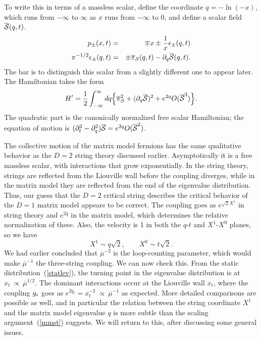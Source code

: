 To write this in terms of a massless scalar, define the coordinate
$q = - \ln(-x)$, which runs from $-\infty$ to $\infty$ as
$x$ runs from $-\infty$ to 0, and define a scalar field
$\overline{\cal S}(q,t)$.
\begin{eqnarray}
p_{\pm}(x,t) &=& \mp x \pm \frac{1}{x} \epsilon_\pm(q,t)  \label{ppm}
\nonumber\\
\pi^{-1/2} \epsilon_\pm(q,t) &=& \pm \overline\pi_{\cal S}(q,t) -
\partial_q \overline {\cal S}(q,t).
\end{eqnarray}
The bar is to distinguish
this scalar from a slightly different one to appear later.  The
Hamiltonian takes the form
\begin{equation}
H' = \frac{1}{2} \int_{-\infty}^\infty
 dq \Bigl\{ \overline\pi_{\cal S}^2 + (\partial_q \overline {\cal
S})^2 + e^{2q} O(\overline {\cal S}^3) \Bigr\}.
\end{equation}
The quadratic part is the canonically normalized free scalar
Hamiltonian; the equation of motion is $(\partial_t^2 -
\partial_q^2) \overline {\cal S} = e^{2q} O(\overline {\cal
S}^2)$.

The collective motion of the matrix model fermions has the same
qualitative behavior as the $D=2$ string theory discussed earlier.
Asymptotically it is a free massless scalar, with interactions
that grow exponentially.  In the string theory, strings are
reflected from the Liouville wall before the coupling diverges,
while in the matrix model they are reflected from the end of the
eigenvalue distribution.  Thus, our guess that the $D=2$
critical string describes the critical behavior of the $D=1$ matrix
model appears to be correct.  The coupling goes as $e^{\sqrt{2}
X^1}$ in string theory and $e^{2q}$ in the matrix model, which
determines the relative normalization of these.  Also, the velocity
is 1 in both the $q$-$t$ and $X^1$-$X^0$ planes, so we have
\begin{equation}
X^1 \sim q \sqrt{2},\qquad X^0 \sim t \sqrt{2}. \label{mmst}
\end{equation}
We had earlier concluded that $\overline \mu^{-2}$ is the
loop-counting parameter, which would make $\overline \mu^{-1}$
the three-string coupling.  We can now check this.  From the
static distribution~(\ref{statlev}), the turning point in the
eigenvalue distribution is at $x_t \ \propto\ \overline\mu^{1/2}$.
The dominant
interactions occur at the Liouville wall $x_t$, where the coupling
$g_{\rm s}$ goes as $e^{2q_t}= x_t^{-2} \ \propto\
\overline\mu^{-1}$ as expected.
More detailed comparisons are possible as
well, and in particular the relation between the string
coordinate $X^1$ and the matrix model eigenvalue $q$ is more
subtle than the scaling argument~(\ref{mmst}) suggests. 
We will return to this,
after discussing some general issues.

